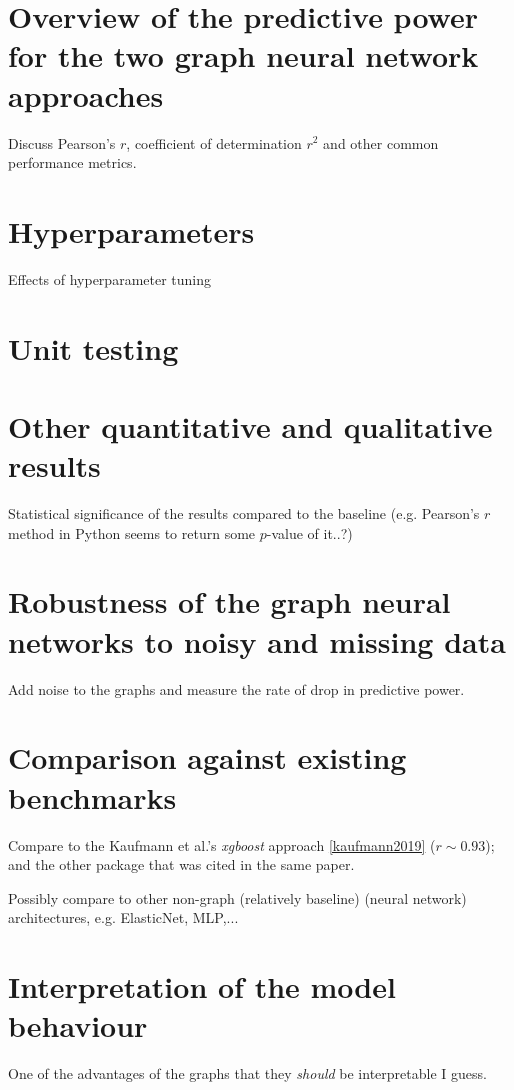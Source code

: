 \documentclass[12pt,a4paper,twoside, openright, hidelinks]{report}
\begin{document}
\section{Overview of the predictive power for the two graph neural network approaches}

Discuss Pearson's $r$, coefficient of determination $r^2$ and other common performance metrics.

\section{Hyperparameters}
Effects of hyperparameter tuning

\section{Unit testing}

\section{Other quantitative and qualitative results}
Statistical significance of the results compared to the baseline (e.g. Pearson's $r$ method in Python seems to return some $p$-value of it..?)

\section{Robustness of the graph neural networks to noisy and missing data}

Add noise to the graphs and measure the rate of drop in predictive power.

\section{Comparison against existing benchmarks}

Compare to the Kaufmann et al.'s \textit{xgboost} approach \ref{kaufmann2019} ($r \sim 0.93$); and the other package that was cited in the same paper.

Possibly compare to other non-graph (relatively baseline) (neural network) architectures, e.g. ElasticNet, MLP,...

\section{Interpretation of the model behaviour}
One of the advantages of the graphs that they \textit{should} be interpretable I guess.
\end{document}
